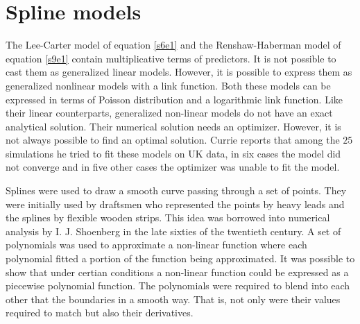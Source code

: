 \documentclass{article}
\numberwithin{equation}{section}
\begin{document}
\section{Spline models}\label{s13}
The Lee-Carter model of equation \eqref{s6e1} and the Renshaw-Haberman model
of equation \eqref{s9e1} contain multiplicative terms of predictors. It is 
not possible to cast them as generalized linear models. However, it is possible
to express them as generalized nonlinear models with a link function. Both
these models can be expressed in terms of Poisson distribution and a logarithmic
link function. Like their linear counterparts, generalized non-linear models
do not have an exact analytical solution. Their numerical solution needs an
optimizer. However, it is not always possible to find an optimal solution.
Currie reports that \cite{currie2013fitting} among the $25$ simulations he
tried to fit these models on UK data, in six cases the model did not converge
and in five other cases the optimizer was unable to fit the model. 

Splines were used to draw a smooth curve passing through a set of points. They
were initially used by draftsmen who represented the points by heavy leads and
the splines by flexible wooden strips. This idea was borrowed into numerical
analysis by I. J. Shoenberg \cite{schoenberg1969cardinal} in the late sixties
of the twentieth century. A set of polynomials was used to approximate a
non-linear function where each polynomial fitted a portion of the function
being approximated. It was possible to show that under certian conditions
\cite{schoenberg1969cardinal} a non-linear function could be expressed as a 
piecewise polynomial function. The polynomials were required to blend into each
other that the boundaries in a smooth way. That is, not only were their values
required to match but also their derivatives.
\end{document}
